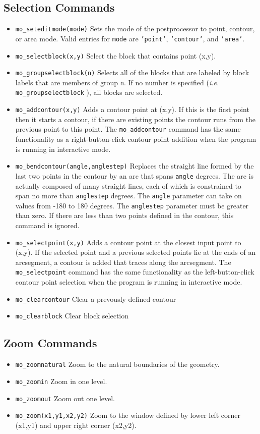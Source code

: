 \subsection{Selection Commands}
\begin{itemize}
\item{\tt mo\_seteditmode(mode)} Sets the mode of the postprocessor to
point, contour, or area mode.  Valid entries for {\tt mode} are
{\tt 'point'}, {\tt 'contour'}, and {\tt 'area'}.
\item{\tt mo\_selectblock(x,y)} Select the block that contains point (x,y).
\item{\tt mo\_groupselectblock(n)} Selects all of the blocks that are labeled by block
        labels that are members of group {\tt n}. If no number is specified ({\em i.e.} {\tt mo\_groupselectblock} ),
                all blocks are selected.

\item{\tt mo\_addcontour(x,y)} Adds a contour point at (x,y). If this
is the first point then it starts a contour, if there are existing
points the contour runs from the previous point to this point. The
{\tt mo\_addcontour} command has the same functionality as a
right-button-click contour point addition when the program is
running in interactive mode.
\item{\tt mo\_bendcontour(angle,anglestep)} Replaces the straight line
formed by the last two points in the contour by an arc that spans {\tt angle}
degrees.  The arc is actually composed of many straight lines, each
of which is constrained to span no more than {\tt anglestep} degrees.
The {\tt angle} parameter can take on values from -180 to 180 degrees.
The {\tt anglestep} parameter must be greater than zero.  If there are less
than two points defined in the contour, this command is ignored.
\item{\tt mo\_selectpoint(x,y)} Adds a contour point at the closest
input point to (x,y).  If the selected point and a previous
selected points lie at the ends of an arcsegment, a contour is
added that traces along the arcsegment.  The {\tt mo\_selectpoint}
command has the same functionality as the left-button-click contour
point selection when the program is running in interactive mode.
\item{\tt mo\_clearcontour} Clear a prevously defined contour
\item{\tt mo\_clearblock} Clear block selection
\end{itemize}

\subsection{Zoom Commands}
\begin{itemize}
\item{\verb+mo_zoomnatural+} Zoom to the natural boundaries of
the geometry.
\item{\verb+mo_zoomin+} Zoom in one level.
\item{\verb+mo_zoomout+} Zoom out one level.
\item{\tt mo\_zoom(x1,y1,x2,y2)} Zoom to the window defined by lower left corner (x1,y1)
and upper right corner (x2,y2).

\end{itemize}

